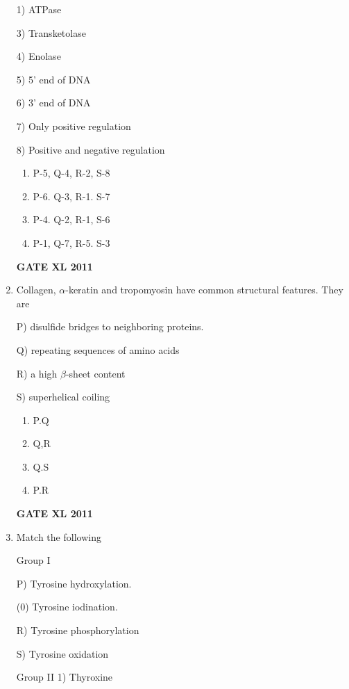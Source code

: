\documentclass[journal,12pt,onecolumn]{IEEEtran}
\begin{document}
\begin{enumerate}
\begin{minipage}{0.5\textwidth}
\begin{flushleft}
1) ATPase

3) Transketolase

4) Enolase

5) 5' end of DNA

6) 3' end of DNA

7) Only positive regulation

8) Positive and negative regulation
		\end{flushleft}
		\end{minipage}

		\begin{enumerate}
			\item P-5, Q-4, R-2, S-8
			\item P-6. Q-3, R-1. S-7
			\item P-4. Q-2, R-1, S-6
			\item P-1, Q-7, R-5. S-3
		\end{enumerate}
		\hfill{\textbf{GATE XL 2011}}

\item{Collagen, $\alpha$-keratin and tropomyosin have common structural features. They are

P) disulfide bridges to neighboring proteins.

Q) repeating sequences of amino acids

R) a high $\beta$-sheet content

S) superhelical coiling}
		\begin{enumerate}
			\item P.Q
			\item Q,R
			\item Q.S
			\item P.R
		\end{enumerate}
		\hfill{\textbf{GATE XL 2011}}

\item {Match the following}
	


\begin{minipage}{0.5\textwidth}
	\begin{flushleft}


Group I

P) Tyrosine hydroxylation.

(0) Tyrosine iodination.

R) Tyrosine phosphorylation

S) Tyrosine oxidation

		\end{flushleft}
		\end{minipage}
	\begin{minipage}{0.5\textwidth}
		\begin{flushleft}
Group II
1) Thyroxine



\end{flushleft}
\end{minipage}
\end{enumerate}
\end{document}

